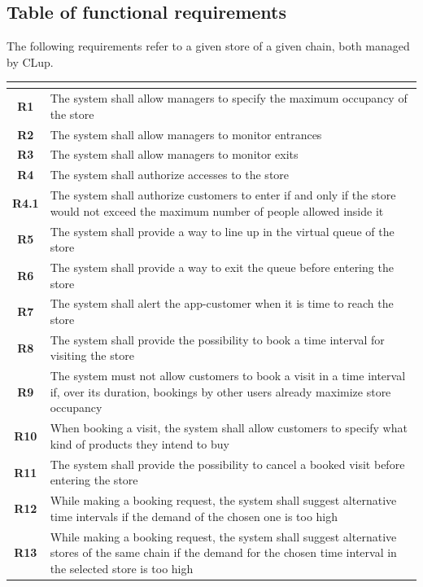 \documentclass[a4paper,oneside,11pt]{book}   %
\begin{document}
    \subsection{Table of functional requirements}
    The following requirements refer to a given store of a given chain, both managed by CLup.
    \begin{longtable}[c]{|>{\bfseries{}}c|H{.65\textwidth}|}
        \hline
         \\
        \hline
        R1   & The system shall allow managers to specify the maximum occupancy of the store \\ \hline
        R2   & The system shall allow managers to monitor entrances \\ \hline
        R3   & The system shall allow managers to monitor exits \\ \hline
        R4   & The system shall authorize accesses to the store \\ \hline
        R4.1 & The system shall authorize customers to enter if and only if the store would not exceed the maximum number of people allowed inside it \\ \hline
        R5   & The system shall provide a way to line up in the virtual queue of the store \\ \hline
        R6   & The system shall provide a way to exit the queue before entering the store \\ \hline
        R7   & The system shall alert the app-customer when it is time to reach the store \\ \hline
        R8   & The system shall provide the possibility to book a time interval for visiting the store \\ \hline
        R9   & The system must not allow customers to book a visit in a time interval if, over its duration, bookings by other users already maximize store occupancy \\ \hline
        R10  & When booking a visit, the system shall allow customers to specify what kind of products they intend to buy \\ \hline
        R11  & The system shall provide the possibility to cancel a booked visit before entering the store \\ \hline
        R12  & While making a booking request, the system shall suggest alternative time intervals if the demand of the chosen one is too high \\ \hline
        R13  & While making a booking request, the system shall suggest alternative stores of the same chain if the demand for the chosen time interval in the selected store is too high \\ \hline

\end{longtable}
\end{document}
